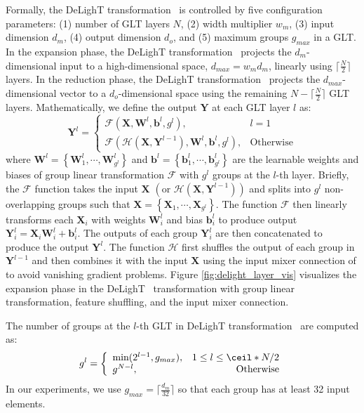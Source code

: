 Formally, the DeLighT transformation ~is controlled by five configuration parameters: (1) number of GLT layers $N$, (2) width multiplier $w_m$, (3) input dimension $d_m$, (4) output dimension $d_o$, and (5) maximum groups $g_{max}$ in a GLT. In the expansion phase, the DeLighT transformation ~projects the $d_m$-dimensional input to a high-dimensional space, $d_{max}=w_m d_m$, linearly using $\lceil \frac{N}{2} \rceil$ layers. In the reduction phase, the DeLighT transformation ~projects the $d_{max}$-dimensional vector to a $d_o$-dimensional space using the remaining $N - \lceil \frac{N}{2} \rceil$ GLT layers. Mathematically, we  define the output $\mathbf{Y}$ at each GLT layer $l$ as:
\begin{equation}
    \mathbf{Y}^l = \left\{
    \begin{array}{ll}
        \mathcal{F} \left(\mathbf{X}, \mathbf{W}^l, \mathbf{b}^l, g^l\right), & l = 1 \\
        \mathcal{F} \left( \mathcal{H}\left(\mathbf{X}, \mathbf{Y}^{l-1}\right), \mathbf{W}^l,  \mathbf{b}^l, g^l\right), &  \text{Otherwise}
    \end{array}
    \right.
    \label{eq:glt}
\end{equation}
where $\mathbf{W}^l = \left\{ \mathbf{W}^l_1, \cdots, \mathbf{W}^l_{g^l}\right\}$ and $\mathbf{b}^l = \left\{ \mathbf{b}^l_1, \cdots, \mathbf{b}^l_{g^l}\right\}$ are the learnable weights and biases of group linear transformation $\mathcal{F}$ with $g^l$ groups at the $l$-th layer. Briefly, the $\mathcal{F}$ function takes the input $\mathbf{X}$ $\left(\text{or } \mathcal{H}\left(\mathbf{X}, \mathbf{Y}^{l-1}\right)\right)$ and splits into $g^l$ non-overlapping groups such that $\mathbf{X} = \left\{\mathbf{X}_1, \cdots, \mathbf{X}_{g^l} \right\}$. The function $\mathcal{F}$ then linearly transforms each $\mathbf{X}_i$ with weights $\mathbf{W}^l_i$ and bias $\mathbf{b}^l_i$ to produce output $\mathbf{Y}^l_i = \mathbf{X}_i \mathbf{W}_i^l + \mathbf{b}_i^l$. The outputs of each group $\mathbf{Y}^l_i$ are then concatenated to produce the output $\mathbf{Y}^l$. The function $\mathcal{H}$ first shuffles the output of each group in $\mathbf{Y}^{l-1}$ and then combines it with the input $\mathbf{X}$ using the input mixer connection of \citet{mehta2020DeFINE} to avoid vanishing gradient problems. Figure \ref{fig:delight_layer_vis} visualizes the expansion phase in the DeLighT ~transformation with group linear transformation, feature shuffling, and the input mixer connection.

The number of groups at the $l$-th GLT in DeLighT transformation ~are computed as:
\begin{equation}
    g^l = \left\{
    \begin{array}{lr}
       \text{min}(2^{l-1}, g_{max}), & 1 \leq l \leq \ceil*{N/2} \\
       g^{N-l}, & \text{Otherwise}
    \end{array}
    \right.
    \label{eq:group}
\end{equation}
In our experiments, we use $g_{max} = \lceil \frac{d_m}{32} \rceil$ so that each group has at least 32 input elements. 

